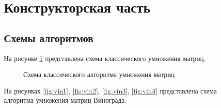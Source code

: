 \section{Конструкторская часть}

\subsection{Схемы алгоритмов}
На рисунке \ref{fig:base} представлена схема классического умножения матриц.

\newpage
\begin{figure}
\caption{Схема классического алгоритма умножения матриц}
\label{fig:base}
\end{figure}

На рисунках \ref{fig:vin1}, \ref{fig:vin2}, \ref{fig:vin3}, \ref{fig:vin4} представлена схема алгоритма умножения матриц Винограда.

